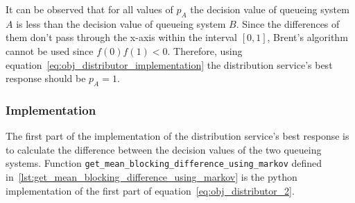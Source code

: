 It can be observed that for all values of \(p_A\) the decision value of queueing
system \(A\) is less than the decision value of queueing system \(B\).
Since the differences of them don't pass through the x-axis within the interval
\([0,1]\), Brent's algorithm cannot be used since \(f(0)f(1) < 0\).
Therefore, using equation~\eqref{eq:obj_distributor_implementation} the
distribution service's best response should be \(p_A = 1\).

\subsubsection{Implementation}

The first part of the implementation of the distribution service's best
response is to calculate the difference between the decision values of the two
queueing systems.
Function \texttt{get\_mean\_blocking\_difference\_using\_markov}
defined in~\ref{lst:get_mean_blocking_difference_using_markov}
is the python implementation of the first part of
equation~\eqref{eq:obj_distributor_2}.

\vspace{0.5cm}

